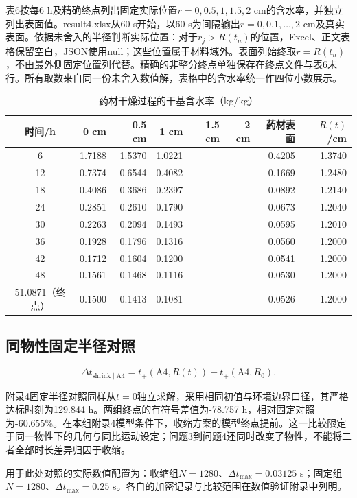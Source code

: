 表6按每6 h及精确终点列出固定实际位置$r=0,0.5,1,1.5,2$ cm的含水率，并独立列出表面值。result4.xlsx从60 s开始，以60 s为间隔输出$r=0,0.1,\ldots,2$ cm及真实表面。依据未舍入的半径判断实际位置：对于$r_j>R(t_n)$的位置，Excel、正文表格保留空白，JSON使用null；这些位置属于材料域外。表面列始终取$r=R(t_n)$，不由最外侧固定位置列代替。精确的非整分终点单独保存在终点文件与表6末行。所有取数来自同一份未舍入数值解，表格中的含水率统一作四位小数展示。

\begin{table}[htbp]\centering
\caption{药材干燥过程的干基含水率（kg/kg）}\label{tab:q4-c}
\begin{tabular}{c|rrrrrrr}\hline
时间/h & 0 cm & 0.5 cm & 1 cm & 1.5 cm & 2 cm & 药材表面 & $R(t)$/cm \\\hline
6 & 1.7188 & 1.5370 & 1.0221 &  &  & 0.4205 & 1.3740 \\
12 & 0.7374 & 0.6544 & 0.4082 &  &  & 0.1669 & 1.2480 \\
18 & 0.4086 & 0.3686 & 0.2397 &  &  & 0.0892 & 1.2140 \\
24 & 0.2851 & 0.2610 & 0.1790 &  &  & 0.0673 & 1.2040 \\
30 & 0.2263 & 0.2094 & 0.1493 &  &  & 0.0595 & 1.2010 \\
36 & 0.1928 & 0.1796 & 0.1316 &  &  & 0.0560 & 1.2000 \\
42 & 0.1712 & 0.1604 & 0.1200 &  &  & 0.0541 & 1.2000 \\
48 & 0.1561 & 0.1468 & 0.1116 &  &  & 0.0530 & 1.2000 \\
51.0871（终点） & 0.1500 & 0.1413 & 0.1081 &  &  & 0.0526 & 1.2000 \\
\hline\end{tabular}
\end{table}

\subsection{同物性固定半径对照}

\[
\Delta t_{\mathrm{shrink}\mid\mathrm{A4}}=t_+(\mathrm{A4},R(t))-t_+(\mathrm{A4},R_0).
\]

附录4固定半径对照同样从$t=0$独立求解，采用相同初值与环境边界口径，其严格达标时刻为129.844 h。两组终点的有符号差值为-78.757 h，相对固定对照为-60.655\%。在本组附录4模型条件下，收缩方案的模型终点提前。这一比较限定于同一物性下的几何与同比运动设定；问题3到问题4还同时改变了物性，不能将二者全部时长差异归因于收缩。

用于此处对照的实际数值配置为：收缩组$N=1280$、$\Delta t_{\max}=0.03125$ s；固定组$N=1280$、$\Delta t_{\max}=0.25$ s。各自的加密记录与比较范围在数值验证附录中列明。


